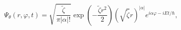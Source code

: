 \begin{equation}
\Psi_{\theta}\left(  r,\varphi,t\right)  =\sqrt{\frac{\tilde{\zeta}}%
{\pi\left|  \alpha\right|  !}}\exp\left(  -\frac{\tilde{\zeta}r^{2}}%
{2}\right)  \left(  \sqrt{\tilde{\zeta}}r\right)  ^{\left|  \alpha\right|
}e^{i\alpha\varphi-iEt/\hbar},\label{37}%
\end{equation}

